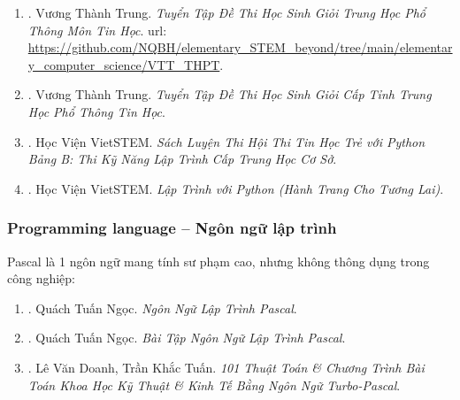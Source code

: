 \documentclass[12pt,twoside]{book}
\begin{document}
\begin{enumerate}
	{\tt Dec 8, 2024}, tôi có lên group Facebook của \href{https://www.facebook.com/groups/VNOIForum}{\it VNOI -- Diễn đàn Olympic Tin Học Việt Nam} thì thấy thông báo của thầy {\sc Hồ Đắc Phương} về việc thầy {\sc Vương Thành Trung}, giáo viên phụ trách Đội tuyển Tin của tỉnh Hòa Bình (cuối tháng 12, 2021, tôi cách ly Covid ở khu Quân sự tỉnh Hòa Bình khi từ Áo trở về Việt Nam), qua đời ngày đầu tháng 12, 2024 do bị 1 tên nghiện ma túy đâm chết. Mong thầy yên nghỉ. Di sản của thầy sẽ được các lứa học sinh chuyên Tin tiếp theo kế thừa \& tiếp tục phát triển. Đấy là điều chắc chắn.
	
	\item \cite{Trung_THPT_Tin}. {\sc Vương Thành Trung}. {\it Tuyển Tập Đề Thi Học Sinh Giỏi Trung Học Phổ Thông Môn Tin Học}. {\sc url}: \url{https://github.com/NQBH/elementary_STEM_beyond/tree/main/elementary_computer_science/VTT_THPT}.
	
	\item \cite{Trung_HSG_THPT_Tin}. {\sc Vương Thành Trung}. {\it Tuyển Tập Đề Thi Học Sinh Giỏi Cấp Tỉnh Trung Học Phổ Thông Tin Học}.
	
	\item \cite{VietSTEM2021}. {\sc Học Viện VietSTEM}. {\it Sách Luyện Thi Hội Thi Tin Học Trẻ  với Python Bảng B: Thi Kỹ Năng Lập Trình Cấp Trung Học Cơ Sở}.
	
	\item \cite{VietSTEM2022}. {\sc Học Viện VietSTEM}. {\it Lập Trình với Python (Hành Trang Cho Tương Lai)}.
\end{enumerate}

\subsubsection{Programming language -- Ngôn ngữ lập trình}
Pascal là 1 ngôn ngữ mang tính sư phạm cao, nhưng không thông dụng trong công nghiệp:

\begin{enumerate}
	\item \cite{Ngoc_Pascal}. {\sc Quách Tuấn Ngọc}. {\it Ngôn Ngữ Lập Trình Pascal}.
	
	\item \cite{Ngoc_BT_Pascal}. {\sc Quách Tuấn Ngọc}. {\it Bài Tập Ngôn Ngữ Lập Trình Pascal}.
	
	\item \cite{Doanh_Tuan_Pascal}. {\sc Lê Văn Doanh, Trần Khắc Tuấn}. {\it101 Thuật Toán \& Chương Trình Bài Toán Khoa Học Kỹ Thuật \& Kinh Tế Bằng Ngôn Ngữ Turbo-Pascal}.
\end{enumerate}
\end{document}
